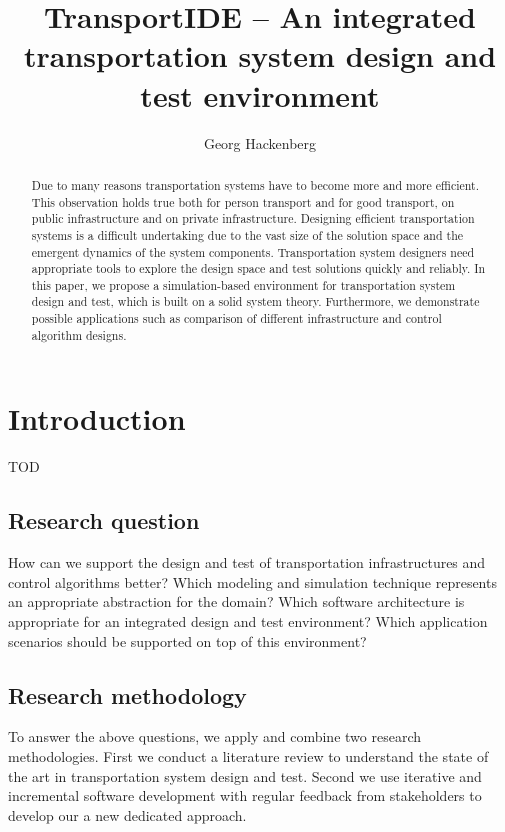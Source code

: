 \documentclass{article}
\begin{document}
    \title{\textbf{TransportIDE} -- An integrated transportation system design and test environment}
    \author{Georg Hackenberg}
    \maketitle
    
    \begin{abstract}
        Due to many reasons transportation systems have to become more and more efficient.
        This observation holds true both for person transport and for good transport, on public infrastructure and on private infrastructure.
        Designing efficient transportation systems is a difficult undertaking due to the vast size of the solution space and the emergent dynamics of the system components.
        Transportation system designers need appropriate tools to explore the design space and test solutions quickly and reliably.
        In this paper, we propose a simulation-based environment for transportation system design and test, which is built on a solid system theory.
        Furthermore, we demonstrate possible applications such as comparison of different infrastructure and control algorithm designs.
    \end{abstract}
    
    \section{Introduction}
    \label{sec:intro}
    TOD

    \subsection*{Research question}
    How can we support the design and test of transportation infrastructures and control algorithms better?
    Which modeling and simulation technique represents an appropriate abstraction for the domain?
    Which software architecture is appropriate for an integrated design and test environment?
    Which application scenarios should be supported on top of this environment?

    \subsection*{Research methodology}
    To answer the above questions, we apply and combine two research methodologies.
    First we conduct a literature review to understand the state of the art in transportation system design and test.
    Second we use iterative and incremental software development with regular feedback from stakeholders to develop our a new dedicated approach.
\end{document}
